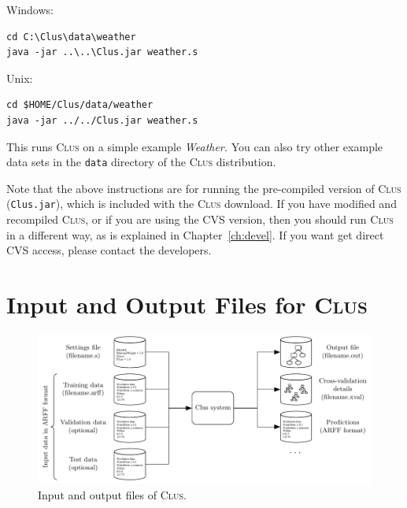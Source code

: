 \documentclass[a4paper]{report}
\newcommand{\clus}{\textsc{Clus}}
\begin{document}
\begin{list}{}{\leftmargin=1.5cm}
\item[Windows:]\mbox{}
\begin{verbatim}
cd C:\Clus\data\weather
java -jar ..\..\Clus.jar weather.s
\end{verbatim}

\item[Unix:]\mbox{}
\begin{verbatim}
cd $HOME/Clus/data/weather
java -jar ../../Clus.jar weather.s
\end{verbatim}
\end{list}

\noindent{}This runs \clus{} on a simple example \emph{Weather.} You can also try other example data sets in the \texttt{data} directory of the \clus{} distribution.

Note that the above instructions are for running the pre-compiled version of \clus{} (\texttt{Clus.jar}), which is included with the \clus{} download. If you have modified and recompiled \clus{}, or if you are using the CVS version, then you should run \clus{} in a different way, as is explained in Chapter~\ref{ch:devel}. If you want get direct CVS access, please contact the developers.

%
\section{Input and Output Files for \clus}

\begin{figure}%
\includegraphics{fig/clusinout}
\caption{\label{fig:iofiles}Input and output files of \clus.}
\end{figure}
\end{document}
